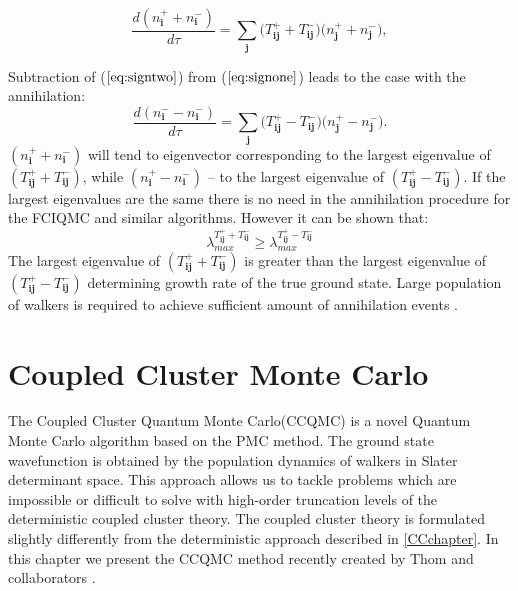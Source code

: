 \documentclass[twoside,english]{uiofysmaster}
\begin{document}
\begin{equation}\label{eq:signwithoutannihilation}
\frac{d ( n_{\boldsymbol{i}}^+ + n_{\boldsymbol{i}}^-)}{d \tau}=\sum_{\boldsymbol{j}}\big(T_{\boldsymbol{ij}}^+  + T_{\boldsymbol{ij}}^-\big) \big( n_{\boldsymbol{j}}^+ + n_{\boldsymbol{j}}^-\big),
\end{equation}

Subtraction of ($\ref{eq:signtwo}$) from ($\ref{eq:signone}$) leads to the case with the annihilation:
\begin{equation}\label{eq:signwithannihilation}
\frac{d (n_{\boldsymbol{i}}^- - n_{\boldsymbol{i}}^-)}{d \tau}=\sum_{\boldsymbol{j}}\big(T_{\boldsymbol{ij}}^+  - T_{\boldsymbol{ij}}^-\big) \big( n_{\boldsymbol{j}}^+ - n_{\boldsymbol{j}}^-\big).
\end{equation}
$(n_{\boldsymbol{i}}^+ + n_{\boldsymbol{i}}^-)$ will tend to eigenvector corresponding to the largest eigenvalue of $(T_{\boldsymbol{ij}}^+  + T_{\boldsymbol{ij}}^-)$, while $(n_{\boldsymbol{i}}^+ - n_{\boldsymbol{i}}^-)$ -- to the largest eigenvalue of $(T_{\boldsymbol{ij}}^+  - T_{\boldsymbol{ij}}^-)$. If the largest eigenvalues are the same there is no need in the annihilation procedure for the FCIQMC and similar algorithms. However it can be shown\cite{Spencersignproblempopulation2012} that:
\begin{equation}
\lambda_{max}^{T_{\boldsymbol{ij}}^+  + T_{\boldsymbol{ij}}^-}   \geq  \lambda_{max}^{T_{\boldsymbol{ij}}^+  - T_{\boldsymbol{ij}}^-}
\end{equation}
The largest eigenvalue of $(T_{\boldsymbol{ij}}^+  + T_{\boldsymbol{ij}}^-)$ is greater than the largest eigenvalue of $(T_{\boldsymbol{ij}}^+  - T_{\boldsymbol{ij}}^-)$ determining growth rate of the true ground state. Large population of walkers is required to achieve sufficient amount of annihilation events\cite{BoothFermionMonteCarlo2009} \cite{Spencersignproblempopulation2012}.





\chapter{Coupled Cluster Monte Carlo}\label{CCQMCChap}

The Coupled Cluster Quantum Monte Carlo(CCQMC) is a novel Quantum
Monte Carlo algorithm based on the PMC method. The ground state
wavefunction is obtained by the population dynamics of walkers in
Slater determinant space. This approach allows us to tackle problems
which are impossible or difficult to solve with high-order truncation
levels of the deterministic coupled cluster theory. The coupled
cluster theory is formulated slightly differently from  the deterministic
approach described in \autoref{CCchapter}.  In this chapter we present
the CCQMC method recently created by Thom and collaborators
\cite{ThomStochasticCoupledCluster2010}.
\end{document}
